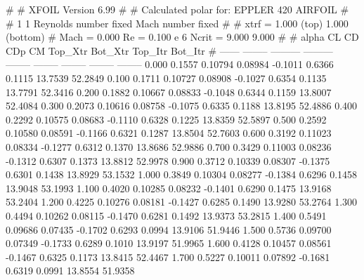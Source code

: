 #  
#       XFOIL         Version 6.99
#  
# Calculated polar for: EPPLER 420 AIRFOIL                              
#  
# 1 1 Reynolds number fixed          Mach number fixed         
#  
# xtrf =   1.000 (top)        1.000 (bottom)  
# Mach =   0.000     Re =     0.100 e 6     Ncrit =   9.000  9.000
#  
#   alpha    CL        CD       CDp       CM     Top_Xtr  Bot_Xtr  Top_Itr  Bot_Itr
#  ------ -------- --------- --------- -------- -------- -------- -------- --------
   0.000   0.1557   0.10794   0.08984  -0.1011   0.6366   0.1115  13.7539  52.2849
   0.100   0.1711   0.10727   0.08908  -0.1027   0.6354   0.1135  13.7791  52.3416
   0.200   0.1882   0.10667   0.08833  -0.1048   0.6344   0.1159  13.8007  52.4084
   0.300   0.2073   0.10616   0.08758  -0.1075   0.6335   0.1188  13.8195  52.4886
   0.400   0.2292   0.10575   0.08683  -0.1110   0.6328   0.1225  13.8359  52.5897
   0.500   0.2592   0.10580   0.08591  -0.1166   0.6321   0.1287  13.8504  52.7603
   0.600   0.3192   0.11023   0.08334  -0.1277   0.6312   0.1370  13.8686  52.9886
   0.700   0.3429   0.11003   0.08236  -0.1312   0.6307   0.1373  13.8812  52.9978
   0.900   0.3712   0.10339   0.08307  -0.1375   0.6301   0.1438  13.8929  53.1532
   1.000   0.3849   0.10304   0.08277  -0.1384   0.6296   0.1458  13.9048  53.1993
   1.100   0.4020   0.10285   0.08232  -0.1401   0.6290   0.1475  13.9168  53.2404
   1.200   0.4225   0.10276   0.08181  -0.1427   0.6285   0.1490  13.9280  53.2764
   1.300   0.4494   0.10262   0.08115  -0.1470   0.6281   0.1492  13.9373  53.2815
   1.400   0.5491   0.09686   0.07435  -0.1702   0.6293   0.0994  13.9106  51.9446
   1.500   0.5736   0.09700   0.07349  -0.1733   0.6289   0.1010  13.9197  51.9965
   1.600   0.4128   0.10457   0.08561  -0.1467   0.6325   0.1173  13.8415  52.4467
   1.700   0.5227   0.10011   0.07892  -0.1681   0.6319   0.0991  13.8554  51.9358
